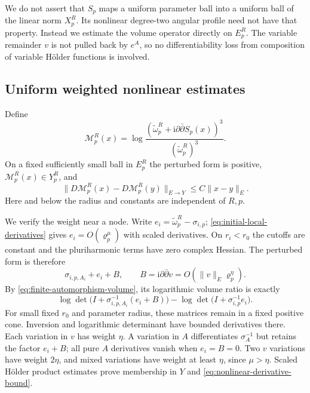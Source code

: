 We do not assert that $S_p$ maps a uniform
parameter ball into a uniform ball of the
linear norm $X_p^R$. Its nonlinear degree-two
angular profile need not have that property.
Instead we estimate the volume operator
directly on $E_p^R$. The variable remainder
$v$ is not pulled back by $e^A$, so no
differentiability loss from composition of
variable Hölder functions is involved.

\subsection{Uniform weighted nonlinear estimates}

Define
\begin{equation}\label{eq:nonlinear-log-volume}
 \mathcal M_p^R(x)=
  \log\frac{(\widetilde\omega_p^R+
            \mathrm i\partial\bar\partial S_p(x))^3}
                 {(\widetilde\omega_p^R)^3}.
\end{equation}
On a fixed sufficiently small ball in $E_p^R$
the perturbed form is positive,
$\mathcal M_p^R(x)\in Y_p^R$, and
\begin{equation}\label{eq:nonlinear-derivative-bound}
 \|D\mathcal M_p^R(x)-D\mathcal M_p^R(y)\|_{E\to Y}
       \le C\|x-y\|_E.
\end{equation}
Here and below the radius and constants are
independent of $R,p$.

We verify the weight near a node. Write
$e_i=\widetilde\omega_p^R-\sigma_{i,p}$;
\eqref{eq:initial-local-derivatives} gives
$e_i=O(\varrho_p^\mu)$ with scaled derivatives.
On $r_i<r_0$ the cutoffs are constant and the
pluriharmonic terms have zero complex Hessian.
The perturbed form is therefore
\[
 \sigma_{i,p,A_i}+e_i+B,\qquad
 B=\mathrm i\partial\bar\partial v
       =O(\|v\|_E\varrho_p^\eta).
\]
By \eqref{eq:finite-automorphism-volume}, its
logarithmic volume ratio is exactly
\begin{equation}\label{eq:weighted-logdet-cancellation}
 \log\det\bigl(I+\sigma_{i,p,A_i}^{-1}(e_i+B)\bigr)
 -\log\det\bigl(I+\sigma_{i,p}^{-1}e_i\bigr).
\end{equation}
For small fixed $r_0$ and parameter radius,
these matrices remain in a fixed positive
cone. Inversion and logarithmic determinant
have bounded derivatives there. Each variation
in $v$ has weight $\eta$. A variation in $A$
differentiates $\sigma_A^{-1}$ but retains
the factor $e_i+B$; all pure $A$ derivatives
vanish when $e_i=B=0$. Two $v$ variations have
weight $2\eta$, and mixed variations have
weight at least $\eta$, since $\mu>\eta$.
Scaled Hölder product estimates prove membership
in $Y$ and \eqref{eq:nonlinear-derivative-bound}.

